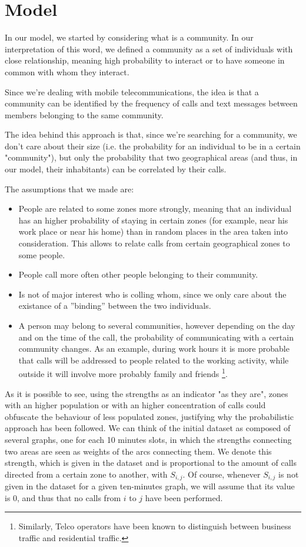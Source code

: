 \section{Model}
In our model, we started by considering what is a community. In our interpretation of this word,
we defined a community as a set of individuals with close relationship, meaning high probability to interact or to have someone in common with whom they interact.

Since we're dealing with mobile telecommunications, the idea is that a community can be identified by the frequency of calls and text messages between members belonging
to the same community.

The idea behind this approach is that, since we're searching for a community, we don't care about their size (i.e. the probability for an individual to be in a certain "community"), 
but only the probability that two geographical areas (and thus, in our model, their inhabitants) can be correlated by their calls.

The assumptions that we made are:
\begin{itemize}
\item People are related to some zones more strongly, meaning that an individual 
has an higher probability of staying in certain zones (for example, near his work place or near his home) than in random places
in the area taken into consideration. This allows to relate calls from certain geographical zones to some people.
\item People call more often other people belonging to their community.
\item Is not of major interest who is colling whom, since we only care about the existance of a ''binding'' between the two individuals.
\item A person may belong to several communities, however depending on the day and on the time of the call, the probability of communicating with a certain community changes.
As an example, during work hours it is more probable that calls will be addressed to people related to the working activity, while outside it will involve more probably family and friends
\footnote{Similarly, Telco operators have been known to distinguish between business traffic and residential traffic.}.
\end{itemize}

As it is possible to see, using the strengths as an indicator "as they are", zones with an higher population or with an higher concentration of calls could obfuscate the behaviour of less populated zones, justifying why the probabilistic approach has been followed.
We can think of the initial dataset as composed of several graphs, one for each 10 minutes slots, in which the strengths connecting two areas are seen as weights of the arcs connecting them. We denote this strength, which is given in the
dataset and is proportional to the amount of calls directed from a certain zone to another, with $S_{i,j}$. 
Of course, whenever $S_{i,j}$ is not given in the dataset for a given ten-minutes graph, we will assume that its value is 0, and thus that no calls from $i$ to $j$ have been performed.

